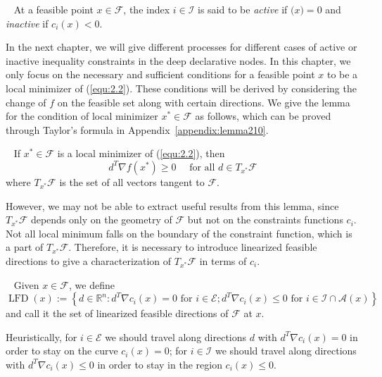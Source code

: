 \begin{defn}~\citep{JS:06}
    At a feasible point $x \in \mathscr{F}$, the index $i \in \mathscr{I}$ is said to be \emph{active} if $\mathscr(x) = 0$ and \emph{inactive} if $c_i(x) < 0$.  
\end{defn}
\par In the next chapter, we will give different processes for different cases of active or inactive inequality constraints in the deep declarative nodes. In this chapter, we only focus on the necessary and sufficient conditions for a feasible point $x$ to be a local minimizer of (\ref{equ:2.2}). These conditions will be derived by considering the change of $f$ on the feasible set along with certain directions. We give the lemma for the condition of local minimizer $x^* \in \mathscr{F}$ as follows, which can be proved through Taylor’s formula in Appendix~\ref{appendix:lemma210}.
\begin{lemma}~\citep{JS:06}
    \label{lemma:210}
    If $x^* \in \mathscr{F}$ is a local minimizer of (\ref{equ:2.2}), then
    $$
    d^{T} \nabla f\left(x^{*}\right) \geq 0 \quad \textrm { for all } d \in T_{x^{*}} \mathscr{F}
    $$
    where $T_{x^{*}} \mathscr{F}$ is the set of all vectors tangent to $\mathscr{F}$. 
\end{lemma}
\par However, we may not be able to extract useful results from this lemma, since $T_{x^{*}} \mathscr{F}$ depends only on the geometry of $\mathscr{F}$ but not on the constraints functions $c_i$. Not all local minimum falls on the boundary of the constraint function, which is a part of $T_{x^{*}} \mathscr{F}$. Therefore, it is necessary to introduce linearized feasible directions to give a characterization of $T_{x^{*}} \mathscr{F}$ in terms of $c_i$. 
\begin{defn}~\citep{JS:06}
    \label{defn:lfd}
    Given $x \in \mathscr{F}$, we define
    $$
    \operatorname{LFD}(x):=\left\{d \in \mathbb{R}^{n}: d^{T} \nabla c_{i}(x)=0 \text { for } i \in \mathscr{E} ; d^{T} \nabla c_{i}(x) \leq 0 \textrm { for } i \in \mathscr{I} \cap \mathscr{A}(x)\right\}
    $$
    and call it the set of linearized feasible directions of $\mathscr{F}$ at $x$. 
\end{defn}
\par Heuristically, for $i \in \mathscr{E}$ we should travel along directions $d$ with $d^{T} \nabla c_{i}(x)=0$ in order to stay on the curve $c_i(x)=0$; for $i \in \mathscr{I}$ we should travel along directions with $d^{T} \nabla c_{i}(x) \leq 0$ in order to stay in the region $c_i(x) \leq 0$. 
